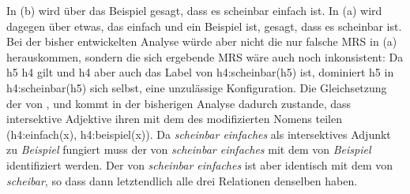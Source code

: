 \noindent
In (b) wird über das Beispiel gesagt, dass es scheinbar einfach ist. In (a) wird
dagegen über etwas, das einfach und ein Beispiel ist, gesagt, dass es scheinbar ist. Bei der bisher
entwickelten Analyse würde aber nicht die nur falsche MRS in (a) herauskommen, sondern die
sich ergebende MRS wäre auch noch inkonsistent:
\ea
{}
\z
Da h5 \qeq h4 gilt und h4 aber auch das Label von h4:scheinbar(h5) ist, dominiert h5 in h4:scheinbar(h5) sich
selbst, eine unzulässige Konfiguration. Die Gleichsetzung der \ltopwe von ,
 und  kommt in der bisherigen Analyse dadurch zustande, dass
intersektive Adjektive ihren \ltopw mit dem des modifizierten Nomens teilen (h4:einfach(x),
h4:beispiel(x)). Da \emph{scheinbar einfaches} als intersektives Adjunkt zu \emph{Beispiel} fungiert
muss der \ltopw von \emph{scheinbar einfaches} mit dem von \emph{Beispiel} identifiziert werden. Der
\ltopw von \emph{scheinbar einfaches} ist aber identisch mit dem von \emph{scheibar}, so dass dann
letztendlich alle drei Relationen denselben \ltopw haben.

